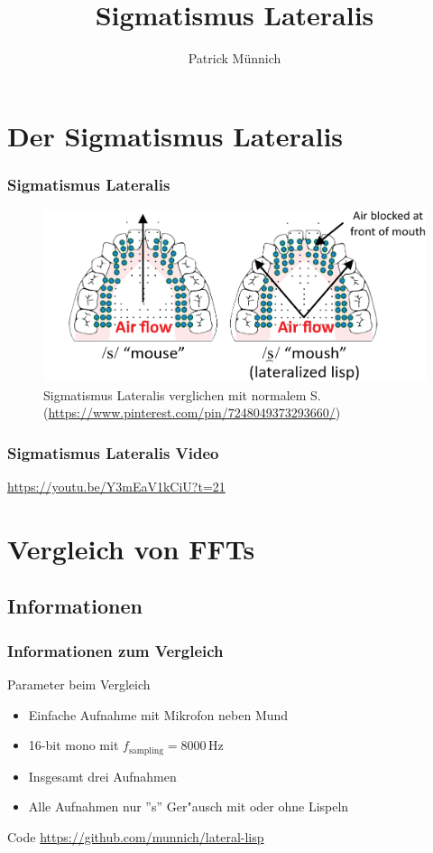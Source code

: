 \documentclass[11pt]{beamer}
\author{Patrick M\"unnich}
\title{Sigmatismus Lateralis}
\institute{Hochschule D\"usseldorf}
\begin{document}
\begin{frame}
\titlepage
\end{frame}

\begin{frame}
\tableofcontents
\end{frame}

\section{Der Sigmatismus Lateralis}

\begin{frame}
\frametitle{Sigmatismus Lateralis}
\begin{figure}
\includegraphics[scale=0.4]{lateral_lisp.png}
\caption{Sigmatismus Lateralis verglichen mit normalem S. (\url{https://www.pinterest.com/pin/7248049373293660/})}
\end{figure}
\end{frame}

\begin{frame}
\frametitle{Sigmatismus Lateralis Video}
\centering
\url{https://youtu.be/Y3mEaV1kCiU?t=21}
\end{frame}

\section{Vergleich von FFTs}

\subsection{Informationen}

\begin{frame}
\frametitle{Informationen zum Vergleich}
\begin{exampleblock}{Parameter beim Vergleich}
\begin{itemize}
\item Einfache Aufnahme mit Mikrofon neben Mund
\item 16-bit mono mit $f_\mathrm{sampling}=8000$\,Hz
\item Insgesamt drei Aufnahmen
\item Alle Aufnahmen nur ''s'' Ger"ausch mit oder ohne Lispeln
\end{itemize}
\end{exampleblock}
\begin{block}{Code}
\url{https://github.com/munnich/lateral-lisp}
\end{block}
\end{frame}
\end{document}

